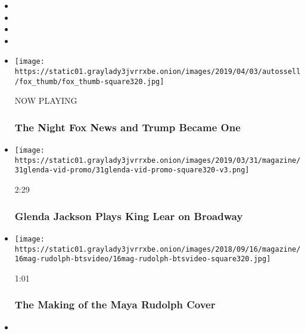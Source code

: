 \begin{itemize}
\item
\item
\item
\item
\end{itemize}

\begin{itemize}
\item
  \texttt{[image: https://static01.graylady3jvrrxbe.onion/images/2019/04/03/autossell/fox\_thumb/fox\_thumb-square320.jpg]}

  NOW PLAYING

  \hypertarget{the-night-fox-news-and-trump-became-one-2}{%
  \subsubsection{The Night Fox News and Trump Became
  One}\label{the-night-fox-news-and-trump-became-one-2}}
\item
  \href{https://www.nytimes3xbfgragh.onion/video/magazine/100000006430808/glenda-jackson-plays-king-lear-on-broadway.html?action=click\&module=video-series-bar\&region=header\&pgtype=Article\&playlistId=video/magazine}{}

  \texttt{[image: https://static01.graylady3jvrrxbe.onion/images/2019/03/31/magazine/31glenda-vid-promo/31glenda-vid-promo-square320-v3.png]}

  2:29

  \hypertarget{glenda-jackson-plays-king-lear-on-broadway}{%
  \subsubsection{Glenda Jackson Plays King Lear on
  Broadway}\label{glenda-jackson-plays-king-lear-on-broadway}}
\item
  \href{https://www.nytimes3xbfgragh.onion/video/magazine/100000006104848/the-making-of-the-maya-rudolph-cover.html?action=click\&module=video-series-bar\&region=header\&pgtype=Article\&playlistId=video/magazine}{}

  \texttt{[image: https://static01.graylady3jvrrxbe.onion/images/2018/09/16/magazine/16mag-rudolph-btsvideo/16mag-rudolph-btsvideo-square320.jpg]}

  1:01

  \hypertarget{the-making-of-the-maya-rudolph-cover}{%
  \subsubsection{The Making of the Maya Rudolph
  Cover}\label{the-making-of-the-maya-rudolph-cover}}
\item
  \href{https://www.nytimes3xbfgragh.onion/video/magazine/100000006065275/dev-hynes-untitled-improvisation-1.html?action=click\&module=video-series-bar\&region=header\&pgtype=Article\&playlistId=video/magazine}{}


\end{itemize}
